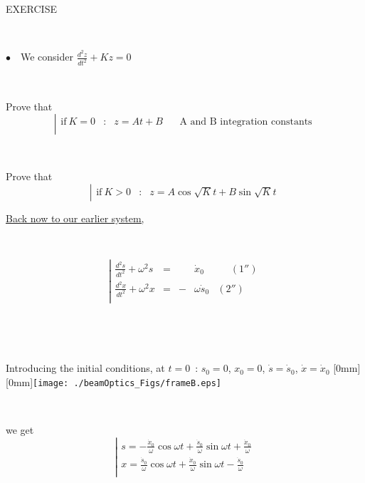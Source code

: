 \documentclass[12pt]{paper}
\newcommand{\nib}{\noindent $\bullet$~}
\newcommand{\nin}{\noindent}
\newcommand{\blue}{\color{blue}}
\begin{document}
\clearpage 

{\blue 
EXERCISE     \label{EX9}

~

\nib\ We consider  $\frac{\textstyle{d^2z}}{\textstyle{dt^2}} + K z   = 0$

~

Prove that 
$$\left| 
\begin{array}{lclr} 
\textrm{if} ~ K  = 0 & : & z = A t + B  & ~ ~ ~ ~ \textrm{A and B integration constants}       \\
\end{array} 
\right.$$

~

Prove that 
$$\left| 
\begin{array}{lcl} 
\textrm{if} ~ K  > 0 & : & z = A \cos\sqrt{K} t  + B \sin\sqrt{K} t   
\end{array} 
\right.$$
}





\clearpage

\nin \underline{Back now to our earlier system, }


~

$$\left| 
\begin{array}{lcclrcccrccr} 
  \frac{\textstyle{d^2s}}{\textstyle{dt^2}} + \omega^2 s &=&  & \dot x_0 & ~ ~ ~ ~ ~ ~   (1'')\\
  \frac{\textstyle{d^2x}}{\textstyle{dt^2}}  +  \omega^2 x &=& -& \omega \dot s_0  &  (2'')\\
\end{array} 
\right.$$

~

~

Introducing the initial conditions, at $t=0$~:  $s_0=0$, $x_0=0$, $\dot s = \dot s_0$, $\dot x = \dot x_0$
   \hfill \raisebox{-40mm}[0mm][0mm]{\texttt{[image: ./beamOptics\_Figs/frameB.eps]}}

~

we get 
$$\left| 
\begin{array}{l} 
 s = -\frac{\textstyle{\dot x_0}}{\textstyle{\omega}} \cos\omega t + \frac{\textstyle{\dot s_0}}{\textstyle{\omega}}  \sin\omega t 
+ \frac{\textstyle{\dot x_0}}{\textstyle{\omega}} \\
 x = \frac{\textstyle{\dot s_0}}{\textstyle{\omega}} \cos\omega t  + \frac{\textstyle{\dot x_0}}{\textstyle{\omega}}  \sin\omega t 
- \frac{\textstyle{\dot s_0}}{\textstyle{\omega}}\\
\end{array} 
\right.$$
\end{document}
